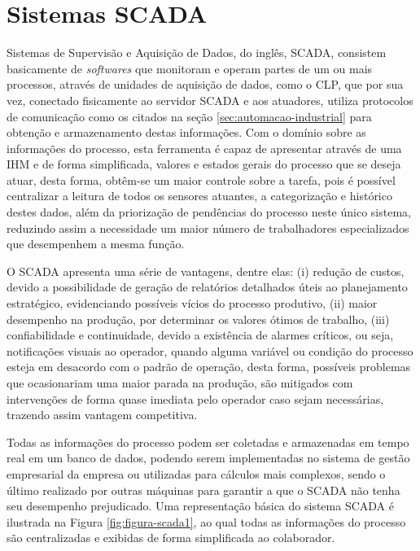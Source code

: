 \chapter{Sistemas SCADA}
\label{chap:scada}

    Sistemas de Supervisão e Aquisição de Dados, do inglês, \gls{SCADA}, consistem basicamente de \textit{softwares} que monitoram e operam partes de um ou mais processos, através de unidades de aquisição de dados, como o \gls{CLP}, que por sua vez, conectado fisicamente ao servidor \gls{SCADA} e aos atuadores, utiliza protocolos de comunicação como os citados na seção \ref{sec:automacao-industrial} para obtenção e armazenamento destas informações. Com o domínio sobre as informações do processo, esta ferramenta é capaz de apresentar através de uma \gls{IHM} e de forma simplificada, valores e estados gerais do processo que se deseja atuar, desta forma, obtêm-se um maior controle sobre a tarefa, pois é possível centralizar a leitura de todos os sensores atuantes, a categorização e histórico destes dados, além da priorização de pendências do processo neste único sistema, reduzindo assim a necessidade um maior número de trabalhadores especializados que desempenhem a mesma função. \cite{WhatScada}
    
    O \gls{SCADA} apresenta uma série de vantagens, dentre elas: (i) redução de custos, devido a possibilidade de geração de relatórios detalhados úteis ao planejamento estratégico, evidenciando possíveis vícios do processo produtivo, (ii) maior desempenho na produção, por determinar os valores ótimos de trabalho, (iii) confiabilidade e continuidade, devido a existência de alarmes críticos, ou seja, notificações visuais ao operador, quando alguma variável ou condição do processo esteja em desacordo com o padrão de operação, desta forma, possíveis problemas que ocasionariam uma maior parada na produção, são mitigados com intervenções de forma quase imediata pelo operador caso sejam necessárias, trazendo assim vantagem competitiva.
    
    Todas as informações do processo podem ser coletadas e armazenadas em tempo real em um banco de dados, podendo serem implementadas no sistema de gestão empresarial da empresa ou utilizadas para cálculos mais complexos, sendo o último realizado por outras máquinas para garantir a que o \gls{SCADA} não tenha seu desempenho prejudicado.
    Uma representação básica do sistema \gls{SCADA} é ilustrada na Figura \ref{fig:figura-scada1}, ao qual todas as informações do processo são centralizadas e exibidas de forma simplificada ao colaborador. 
    
